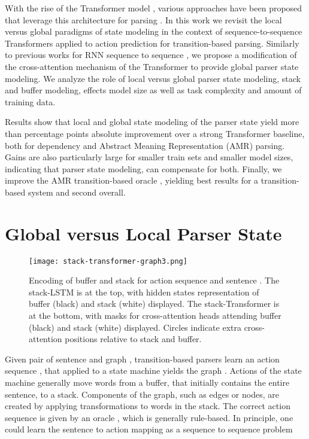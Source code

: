 \documentclass[11pt,a4paper]{article}
\begin{document}
With the rise of the Transformer model \cite{vaswani2017attention}, various approaches have been proposed that leverage this architecture for parsing \cite{kondratyuk201975,kulmizev2019deep,mrini2019rethinking,ahmad-etal-2019-difficulties,cai2020amr}. In this work we revisit the local versus global paradigms of state modeling in the context of sequence-to-sequence Transformers applied to action prediction for transition-based parsing. Similarly to previous works for RNN sequence to sequence \cite{liu-zhang-2017-encoder,zhang-etal-2017-stack}, we propose a modification of the cross-attention mechanism of the Transformer to provide global parser state modeling. We analyze the role of local versus global parser state modeling, stack and buffer modeling, effects model size as well as task complexity and amount of training data.

Results show that local and global state modeling of the parser state yield more than  percentage points absolute improvement over a strong Transformer baseline, both for dependency and Abstract Meaning Representation (AMR) parsing. Gains are also particularly large for smaller train sets and smaller model sizes, indicating that parser state modeling, can compensate for both. Finally, we improve the AMR transition-based oracle \cite{ballesteros2017amr}, yielding best results for a transition-based system and second overall.

\section{Global versus Local Parser State}
\label{section:state}
\begin{figure*}
\centering
  \texttt{[image: stack-transformer-graph3.png]}
  \caption{Encoding of buffer and stack for action sequence  and sentence . The stack-LSTM is at the top, with hidden states representation of buffer (black) and stack (white) displayed. The stack-Transformer is at the bottom, with masks for cross-attention heads attending buffer (black) and stack (white) displayed. Circles indicate extra cross-attention positions relative to stack and buffer.}
  \label{fig:stack-encodings}
\end{figure*}

Given pair of sentence  and graph , transition-based parsers learn an action sequence , that applied to a state machine yields the graph . Actions of the state machine generally move words from a buffer, that initially contains the entire sentence, to a stack. Components of the graph, such as edges or nodes, are created by applying transformations to words in the stack. The correct action sequence is given by an oracle , which is generally rule-based. In principle, one could learn the sentence to action mapping  as a sequence to sequence problem
\end{document}
